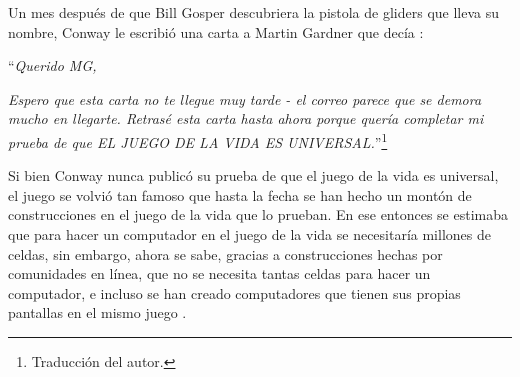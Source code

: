 Un mes despu\'es de que Bill Gosper descubriera la pistola de gliders que lleva su nombre, Conway le escribi\'o una carta a Martin Gardner que dec\'ia \cite{Roberts2015-ur}:

\begin{samepage}
    ``\textit{Querido MG,} 

    \textit { Espero que esta carta no te llegue muy tarde - el correo parece que se demora mucho en llegarte. Retras\'e esta carta hasta ahora porque quer\'ia completar mi prueba de que EL JUEGO DE LA VIDA ES UNIVERSAL.}''\footnote{Traducci\'on del autor.}
\end{samepage}

Si bien Conway nunca public\'o su prueba de que el juego de la vida es universal, el juego se volvi\'o tan famoso que hasta la fecha se han hecho un mont\'on de construcciones en el juego de la vida que lo prueban. En ese entonces se estimaba que para hacer un computador en el juego de la vida se necesitar\'ia millones de celdas, sin embargo, ahora se sabe, gracias a construcciones hechas por comunidades en l\'inea, que no se necesita tantas celdas para hacer un computador, e incluso se han creado computadores que tienen sus propias pantallas en el mismo juego \cite{YTComputerGL}.